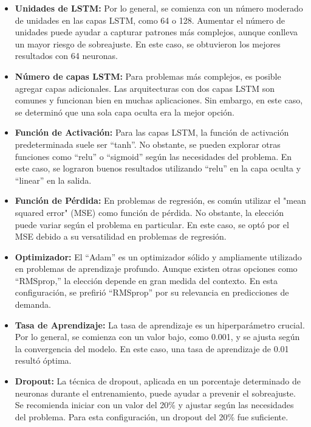 \begin{itemize}
  \item \textbf{Unidades de LSTM:} Por lo general, se comienza con un número moderado de unidades en las capas LSTM, como 64 o 128. Aumentar el número de unidades puede ayudar a capturar patrones más complejos, aunque conlleva un mayor riesgo de sobreajuste. En este caso, se obtuvieron los mejores resultados con 64 neuronas.

  \item \textbf{Número de capas LSTM:} Para problemas más complejos, es posible agregar capas adicionales. Las arquitecturas con dos capas LSTM son comunes y funcionan bien en muchas aplicaciones. Sin embargo, en este caso, se determinó que una sola capa oculta era la mejor opción.

  \item \textbf{Función de Activación:} Para las capas LSTM, la función de activación predeterminada suele ser “tanh”. No obstante, se pueden explorar otras funciones como “relu” o “sigmoid” según las necesidades del problema. En este caso, se lograron buenos resultados utilizando “relu” en la capa oculta y “linear” en la salida.

  \item \textbf{Función de Pérdida:} En problemas de regresión, es común utilizar el "mean squared error" (MSE) como función de pérdida. No obstante, la elección puede variar según el problema en particular. En este caso, se optó por el MSE debido a su versatilidad en problemas de regresión.

  \item \textbf{Optimizador:} El “Adam” es un optimizador sólido y ampliamente utilizado en problemas de aprendizaje profundo. Aunque existen otras opciones como “RMSprop,” la elección depende en gran medida del contexto. En esta configuración, se prefirió “RMSprop” por su relevancia en predicciones de demanda.

  \item \textbf{Tasa de Aprendizaje:} La tasa de aprendizaje es un hiperparámetro crucial. Por lo general, se comienza con un valor bajo, como 0.001, y se ajusta según la convergencia del modelo. En este caso, una tasa de aprendizaje de 0.01 resultó óptima.

  \item \textbf{Dropout:} La técnica de dropout, aplicada en un porcentaje determinado de neuronas durante el entrenamiento, puede ayudar a prevenir el sobreajuste. Se recomienda iniciar con un valor del 20\% y ajustar según las necesidades del problema. Para esta configuración, un dropout del 20\% fue suficiente.
\end{itemize}


